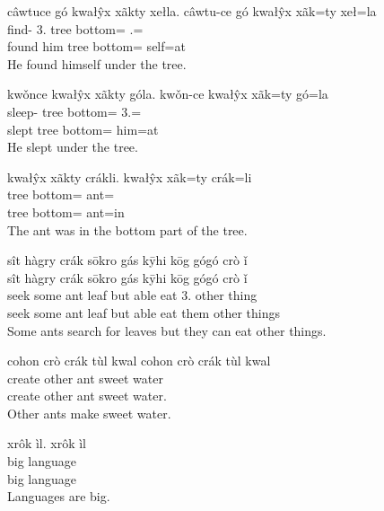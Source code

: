 \begin{exe}
    \ex
    câwtuce gó kwałŷx xãkty xełla.
    \glll
    câwtu-ce gó kwałŷx xãk=ty xeł=la \\
    find-\Pst{} 3\Sg{}.\Anim{} tree bottom=\Poss{} \Refl{}.\Sg{}=\AdessThree{} \\
    found him tree bottom=\Poss{} self=at \\
    \glt
    He found himself under the tree.
\end{exe}

\begin{exe}
    \ex
    kwǒnce kwałŷx xãkty góla.
    \glll
    kwǒn-ce kwałŷx xãk=ty gó=la \\
    sleep-\Pst{} tree bottom=\Poss{} 3\Sg{}.\Anim{}=\AdessThree{} \\
    slept tree bottom=\Poss{} him=at \\
    \glt
    He slept under the tree.
\end{exe}

\begin{exe}
    \ex
    kwałŷx xãkty crákli.
    \glll
    kwałŷx xãk=ty crák=li \\
    tree bottom=\Poss{} ant=\InessThree{} \\
    tree bottom=\Poss{} ant=in \\
    \glt
    The ant was in the bottom part of the tree.
\end{exe}

\begin{exe}
    \ex
    sît hàgry crák sōkro gás kȳhi kōg gógó crò ǐ \\
    \glll
    sît hàgry crák sōkro gás kȳhi kōg gógó crò ǐ \\
    seek some ant leaf but able eat 3\Pl{}.\Anim{} other thing \\
    seek some ant leaf but able eat them other things \\
    \glt
    Some ants search for leaves but they can eat other things.
\end{exe}

\begin{exe}
    \ex
    cohon crò crák tùl kwal
    \glll
    cohon crò crák tùl kwal \\
    create other ant sweet water \\
    create other ant sweet water. \\
    \glt
    Other ants make sweet water.
\end{exe}

\begin{exe}
    \ex
    xrôk ìl.
    \glll
    xrôk ìl \\
    big language \\
    big language \\
    \glt
    Languages are big.
\end{exe}

